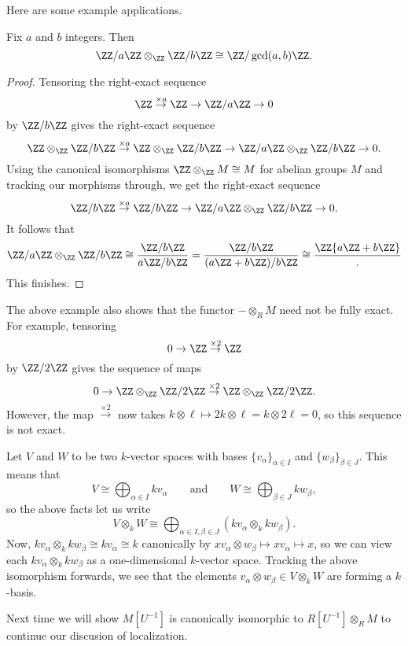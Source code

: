 
Here are some example applications.
\begin{exe}
	Fix $a$ and $b$ integers. Then
	\[\ZZ/a\ZZ\otimes_\ZZ\ZZ/b\ZZ\cong\ZZ/\gcd(a,b)\ZZ.\]
\end{exe}
\begin{proof}
	Tensoring the right-exact sequence
	\[\ZZ\stackrel{\times a}\to\ZZ\to\ZZ/a\ZZ\to0\]
	by $\ZZ/b\ZZ$ gives the right-exact sequence
	\[\ZZ\otimes_\ZZ\ZZ/b\ZZ\stackrel{\times a}\to\ZZ\otimes_\ZZ\ZZ/b\ZZ\to\ZZ/a\ZZ\otimes_\ZZ\ZZ/b\ZZ\to0.\]
	Using the canonical isomorphisms $\ZZ\otimes_\ZZ M\cong M$ for abelian groups $M$ and tracking our morphisms through, we get the right-exact sequence
	\[\ZZ/b\ZZ\stackrel{\times a}\to\ZZ/b\ZZ\to\ZZ/a\ZZ\otimes_\ZZ\ZZ/b\ZZ\to0.\]
	It follows that
	\[\ZZ/a\ZZ\otimes_\ZZ\ZZ/b\ZZ\cong\frac{\ZZ/b\ZZ}{a\ZZ/b\ZZ}=\frac{\ZZ/b\ZZ}{(a\ZZ+b\ZZ)/b\ZZ}\cong\frac\ZZ{a\ZZ+b\ZZ}.\]
	This finishes.
\end{proof}
\begin{remark}
	The above example also shows that the functor $-\otimes_RM$ need not be fully exact. For example, tensoring
	\[0\to\ZZ\stackrel{\times2}\to\ZZ\]
	by $\ZZ/2\ZZ$ gives the sequence of maps
	\[0\to\ZZ\otimes_\ZZ\ZZ/2\ZZ\stackrel{\times2}\to\ZZ\otimes_\ZZ\ZZ/2\ZZ.\]
	However, the map $\stackrel{\times2}\to$ now takes $k\otimes\ell\mapsto2k\otimes\ell=k\otimes2\ell=0$, so this sequence is not exact.
\end{remark}
\begin{example} \label{ex:tensorvecspaces}
	Let $V$ and $W$ to be two $k$-vector spaces with bases $\{v_\alpha\}_{\alpha\in I}$ and $\{w_\beta\}_{\beta\in J}$. This means that
	\[V\cong\bigoplus_{\alpha\in I}kv_\alpha\qquad\text{and}\qquad W\cong\bigoplus_{\beta\in J}kw_\beta,\]
	so the above facts let us write
	\[V\otimes_kW\cong\bigoplus_{\alpha\in I,\beta\in J}(kv_\alpha\otimes_kkw_\beta).\]
	Now, $kv_\alpha\otimes_kkw_\beta\cong kv_\alpha\cong k$ canonically by $xv_\alpha\otimes w_\beta\mapsto xv_\alpha\mapsto x$, so we can view each $kv_\alpha\otimes_kkw_\beta$ as a one-dimensional $k$-vector space. Tracking the above isomorphism forwards, we see that the elements $v_\alpha\otimes w_\beta\in V\otimes_kW$ are forming a $k$-basis.
\end{example}
Next time we will show $M\left[U^{-1}\right]$ is canonically isomorphic to $R\left[U^{-1}\right]\otimes_RM$ to continue our discusion of localization.